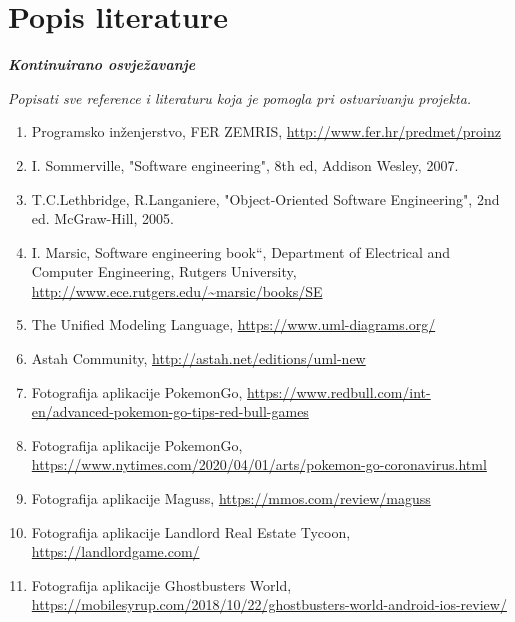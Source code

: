 \chapter*{Popis literature}
	 	
 		\textbf{\textit{Kontinuirano osvježavanje}}
	
		\textit{Popisati sve reference i literaturu koja je pomogla pri ostvarivanju projekta.}
		
		
		\begin{enumerate}
			
			
			\item  Programsko inženjerstvo, FER ZEMRIS, \url{http://www.fer.hr/predmet/proinz}
			
			\item  I. Sommerville, "Software engineering", 8th ed, Addison Wesley, 2007.
			
			\item  T.C.Lethbridge, R.Langaniere, "Object-Oriented Software Engineering", 2nd ed. McGraw-Hill, 2005.
			
			\item  I. Marsic, Software engineering book``, Department of Electrical and Computer Engineering, Rutgers University, \url{http://www.ece.rutgers.edu/~marsic/books/SE}
			
			\item  The Unified Modeling Language, \url{https://www.uml-diagrams.org/}
			
			\item  Astah Community, \url{http://astah.net/editions/uml-new}
			
			\item Fotografija aplikacije PokemonGo, 
			\url {https://www.redbull.com/int-en/advanced-pokemon-go-tips-red-bull-games}
			
			\item Fotografija aplikacije PokemonGo, 
			\url {https://www.nytimes.com/2020/04/01/arts/pokemon-go-coronavirus.html}
			
			\item Fotografija aplikacije Maguss, 
			\url{https://mmos.com/review/maguss}
			
			\item Fotografija aplikacije Landlord Real Estate Tycoon,
			\url{https://landlordgame.com/}
			
			\item Fotografija aplikacije Ghostbusters World,
			\url{https://mobilesyrup.com/2018/10/22/ghostbusters-world-android-ios-review/}
			
		\end{enumerate}
		
		 